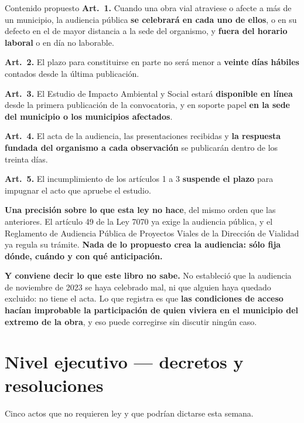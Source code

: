 \begin{ficha}{Contenido propuesto}
\textbf{Art.\ 1.} Cuando una obra vial atraviese o afecte a más de un municipio, la audiencia
pública \textbf{se celebrará en cada uno de ellos}, o en su defecto en el de mayor distancia a
la sede del organismo, y \textbf{fuera del horario laboral} o en día no laborable.

\textbf{Art.\ 2.} El plazo para constituirse en parte no será menor a \textbf{veinte días
hábiles} contados desde la última publicación.

\textbf{Art.\ 3.} El Estudio de Impacto Ambiental y Social estará \textbf{disponible en línea}
desde la primera publicación de la convocatoria, y en soporte papel \textbf{en la sede del
municipio o los municipios afectados}.

\textbf{Art.\ 4.} El acta de la audiencia, las presentaciones recibidas y \textbf{la respuesta
fundada del organismo a cada observación} se publicarán dentro de los treinta días.

\textbf{Art.\ 5.} El incumplimiento de los artículos 1 a 3 \textbf{suspende el plazo} para
impugnar el acto que apruebe el estudio.
\end{ficha}

\begin{cautela}
\textbf{Una precisión sobre lo que esta ley no hace}, del mismo orden que las anteriores. El
artículo 49 de la Ley 7070 ya exige la audiencia pública, y el Reglamento de Audiencia Pública
de Proyectos Viales de la Dirección de Vialidad ya regula su trámite. \textbf{Nada de lo
propuesto crea la audiencia: sólo fija dónde, cuándo y con qué anticipación.}

\textbf{Y conviene decir lo que este libro no sabe.} No estableció que la audiencia de noviembre
de 2023 se haya celebrado mal, ni que alguien haya quedado excluido: no tiene el acta. Lo que
registra es que \textbf{las condiciones de acceso hacían improbable la participación de quien
viviera en el municipio del extremo de la obra}, y eso puede corregirse sin discutir ningún
caso.
\end{cautela}

\section{Nivel ejecutivo --- decretos y resoluciones}

Cinco actos que no requieren ley y que podrían dictarse esta semana.

